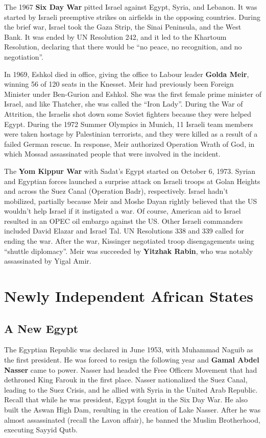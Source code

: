 The 1967 \textbf{Six Day War} pitted Israel against Egypt, Syria, and Lebanon.
It was started by Israeli preemptive strikes on airfields in the opposing countries.
During the brief war, Israel took the Gaza Strip, the Sinai Peninsula, and the West Bank.
It was ended by UN Resolution 242, and it led to the Khartoum Resolution,
declaring that there would be ``no peace, no recognition, and no negotiation''.

In 1969, Eshkol died in office, giving the office to Labour leader \textbf{Golda Meir},
winning 56 of 120 seats in the Knesset.
Meir had previously been Foreign Minister under Ben-Gurion and Eshkol.
She was the first female prime minister of Israel, and like Thatcher, she was called the ``Iron Lady''.
During the War of Attrition, the Israelis shot down some Soviet fighters because they were helped Egypt.
During the 1972 Summer Olympics in Munich, 11 Israeli team members were taken hostage by Palestinian terrorists,
and they were killed as a result of a failed German rescue.
In response, Meir authorized Operation Wrath of God,
in which Mossad assassinated people that were involved in the incident.

The \textbf{Yom Kippur War} with Sadat's Egypt started on October 6, 1973.
Syrian and Egyptian forces launched a surprise attack on Israeli troops
at Golan Heights and across the Suez Canal (Operation Badr), respectively.
Israel hadn't mobilized, partially because Meir and Moshe Dayan rightly believed
that the US wouldn't help Israel if it instigated a war.
Of course, American aid to Israel resulted in an OPEC oil embargo against the US\@.
Other Israeli commanders included David Elazar and Israel Tal.
UN Resolutions 338 and 339 called for ending the war.
After the war, Kissinger negotiated troop disengagements using ``shuttle diplomacy''.
Meir was succeeded by \textbf{Yitzhak Rabin}, who was notably assassinated by Yigal Amir.

\section{Newly Independent African States}

\subsection*{A New Egypt}

The Egyptian Republic was declared in June 1953, with Muhammad Naguib as the first president.
He was forced to resign the following year and \textbf{Gamal Abdel Nasser} came to power.
Nasser had headed the Free Officers Movement that had dethroned King Farouk in the first place.
Nasser nationalized the Suez Canal, leading to the Suez Crisis,
and he allied with Syria in the United Arab Republic.
Recall that while he was president, Egypt fought in the Six Day War.
He also built the Aswan High Dam, resulting in the creation of Lake Nasser.
After he was almost assassinated (recall the Lavon affair), he banned the Muslim Brotherhood,
executing Sayyid Qutb.

